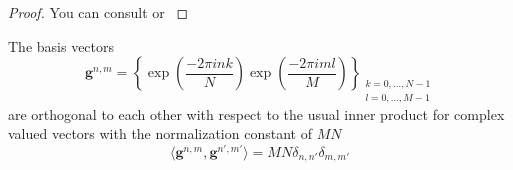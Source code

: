\begin{proof}
    You can consult \cite{wavelets_linear_algebra} or \cite{matrix_analysis_horn} \cite{numerical_tensor_hackbusch}
\end{proof}

\begin{Prop}\label{Prop:2ddftbasisvectors}
    The basis vectors
    \begin{equation}\label{eq:2ddftbasisvectors}
        \boldsymbol{g}^{n,m} = \left\{\exp\left({\frac{-2\pi ink}{N}}\right)\exp\left({\frac{-2\pi iml}{M}}\right)\right\}_{\substack{k=0,\ldots,N-1\\l=0,\ldots,M-1}}
    \end{equation}
    are orthogonal to each other with respect to the usual inner product for complex valued vectors 
    with the normalization constant of $MN$
    \begin{equation}
        \langle\boldsymbol{g}^{n,m},\boldsymbol{g}^{n',m'}\rangle= MN \delta_{n,n'}\delta_{m,m'}
    \end{equation}
\end{Prop}

